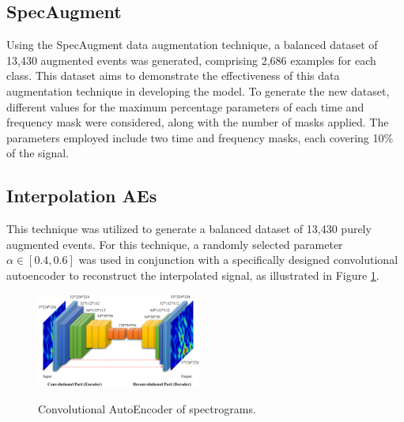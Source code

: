\documentclass[journal]{IEEEtran}
\begin{document}
\subsection{SpecAugment}
Using the SpecAugment data augmentation technique, a balanced dataset of 13,430 augmented events was generated, comprising 2,686 examples for each class. This dataset aims to demonstrate the effectiveness of this data augmentation technique in developing the model. To generate the new dataset, different values for the maximum percentage parameters of each time and frequency mask were considered, along with the number of masks applied.
The parameters employed include two time and frequency masks, each covering 10\% of the signal.
\subsection{Interpolation AEs}
This technique was utilized to generate a balanced dataset of 13,430 purely augmented events.
For this technique, a randomly selected parameter \(\alpha \in \left[0.4, 0.6\right]\) was used in conjunction with a specifically designed convolutional autoencoder to reconstruct the interpolated signal, as illustrated in Figure \ref{fig:cae_interpolation}.

\begin{figure}[h]
\centering
\footnotesize
{\includegraphics[width=0.48\textwidth,keepaspectratio]{img/cae.png}}
\caption{Convolutional AutoEncoder of spectrograms.}
\label{fig:cae_interpolation}
\end{figure}
\end{document}
